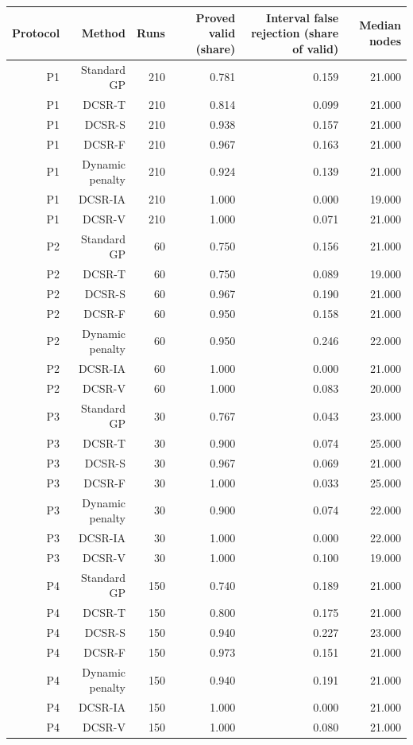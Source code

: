 \begin{tabular}{rrrrrr}
\hline
Protocol & Method & Runs & Proved valid (share) & Interval false rejection (share of valid) & Median nodes \\
\hline
P1 & Standard GP & 210 & 0.781 & 0.159 & 21.000 \\
P1 & DCSR-T & 210 & 0.814 & 0.099 & 21.000 \\
P1 & DCSR-S & 210 & 0.938 & 0.157 & 21.000 \\
P1 & DCSR-F & 210 & 0.967 & 0.163 & 21.000 \\
P1 & Dynamic penalty & 210 & 0.924 & 0.139 & 21.000 \\
P1 & DCSR-IA & 210 & 1.000 & 0.000 & 19.000 \\
P1 & DCSR-V & 210 & 1.000 & 0.071 & 21.000 \\
P2 & Standard GP & 60 & 0.750 & 0.156 & 21.000 \\
P2 & DCSR-T & 60 & 0.750 & 0.089 & 19.000 \\
P2 & DCSR-S & 60 & 0.967 & 0.190 & 21.000 \\
P2 & DCSR-F & 60 & 0.950 & 0.158 & 21.000 \\
P2 & Dynamic penalty & 60 & 0.950 & 0.246 & 22.000 \\
P2 & DCSR-IA & 60 & 1.000 & 0.000 & 21.000 \\
P2 & DCSR-V & 60 & 1.000 & 0.083 & 20.000 \\
P3 & Standard GP & 30 & 0.767 & 0.043 & 23.000 \\
P3 & DCSR-T & 30 & 0.900 & 0.074 & 25.000 \\
P3 & DCSR-S & 30 & 0.967 & 0.069 & 21.000 \\
P3 & DCSR-F & 30 & 1.000 & 0.033 & 25.000 \\
P3 & Dynamic penalty & 30 & 0.900 & 0.074 & 22.000 \\
P3 & DCSR-IA & 30 & 1.000 & 0.000 & 22.000 \\
P3 & DCSR-V & 30 & 1.000 & 0.100 & 19.000 \\
P4 & Standard GP & 150 & 0.740 & 0.189 & 21.000 \\
P4 & DCSR-T & 150 & 0.800 & 0.175 & 21.000 \\
P4 & DCSR-S & 150 & 0.940 & 0.227 & 23.000 \\
P4 & DCSR-F & 150 & 0.973 & 0.151 & 21.000 \\
P4 & Dynamic penalty & 150 & 0.940 & 0.191 & 21.000 \\
P4 & DCSR-IA & 150 & 1.000 & 0.000 & 21.000 \\
P4 & DCSR-V & 150 & 1.000 & 0.080 & 21.000 \\
\hline
\end{tabular}
